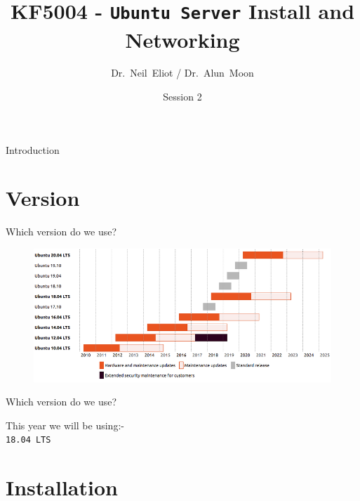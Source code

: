 \documentclass{beamer}
\title{KF5004 - \texttt{Ubuntu Server} Install and Networking}
\author{Dr.~Neil~Eliot\inst{1} / Dr.~Alun~Moon\inst{1}}
\institute[Northumbria University] %
{
  \inst{1}
  Department of Computer and Information Sciences\\
  University of Northumbria
}
\date{Session 2}
\begin{document}
\begin{frame}
  \titlepage
\end{frame}

\begin{frame}{Introduction}
  \tableofcontents
\end{frame}

\section{Version}
\begin{frame}{Which version do we use?}
  \begin{figure}
    \begin{center}
      \includegraphics[width=1\linewidth]{Version.png}
    \end{center}
  \end{figure}
\end{frame}

\begin{frame}{Which version do we use?}
  \begin{center}
    \LARGE This year we will be using:-\\
    \Huge \texttt{18.04 LTS}
  \end{center}
\end{frame}

\section{Installation}
\end{document}
